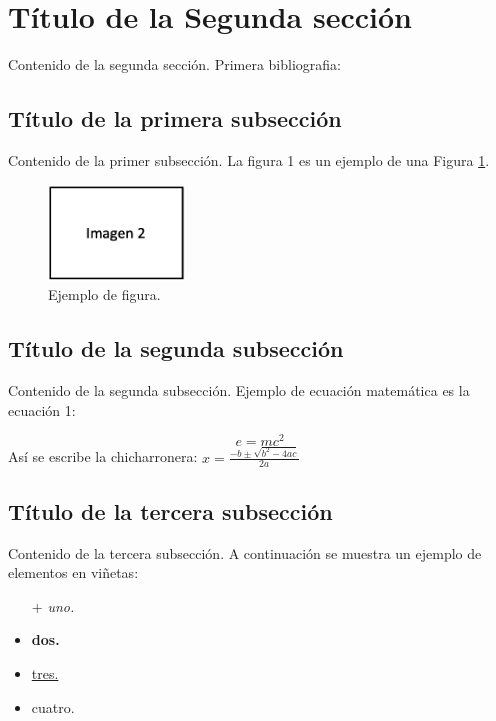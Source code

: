 \section{Título de la Segunda sección}
Contenido de la segunda sección. Primera bibliografia:\cite{bib2}

 \subsection{Título de la primera subsección}
Contenido de la primer subsección. La figura 1 es un ejemplo de una Figura \ref{imagen2}.

\begin{figure}[!h] %
    \begin{center}
        \includegraphics[scale=0.68]{secciones/imagenes/imagen2}
    \end{center}
    \caption{Ejemplo de figura. \label{imagen2}}
\end{figure}

\subsection{Título de la segunda subsección}
Contenido de la segunda subsección. Ejemplo de ecuación matemática es la ecuación 1:

\begin{equation}
    e=mc^2
    \label{ecuacion}
\end{equation}
Así se escribe la chicharronera: $x = \frac {-b \pm \sqrt {b^2 - 4ac}}{2a}$ 

\subsection{Título de la tercera subsección}
Contenido de la tercera subsección. A continuación se muestra un ejemplo de elementos en viñetas:

\begin{itemize} %
    \item [+]\textit{uno.}
    \item \textbf{dos.}
    \item \underline{tres.}
    \item cuatro.
\end{itemize}


